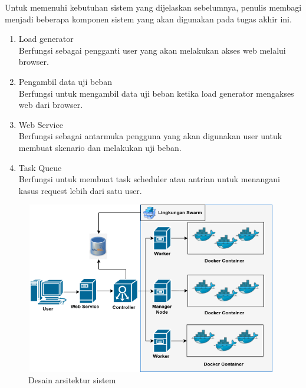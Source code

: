     		Untuk memenuhi kebutuhan sistem yang dijelaskan sebelumnya, penulis membagi menjadi beberapa komponen sistem yang akan digunakan pada tugas akhir ini.
    		
    		\begin{enumerate}
    			\item Load generator \\
    				Berfungsi sebagai pengganti user yang akan melakukan akses web melalui browser.
    			\item Pengambil data uji beban \\
    				Berfungsi untuk mengambil data uji beban ketika load generator mengakses web dari browser.
    			\item Web Service \\
    				Berfungsi sebagai antarmuka pengguna yang akan digunakan user untuk membuat skenario dan melakukan uji beban.
    			\item Task Queue \\
    				Berfungsi untuk membuat task scheduler atau antrian untuk menangani kasus request lebih dari satu user.
    		\end{enumerate}
    	
	    	\begin{figure}[H]
	    		\centering
	    		\includegraphics[width=11cm,height=7.5cm]{Images/C-3/arsitektursistem.png}
	    		\caption{Desain arsitektur sistem}
	    		\label{arsitekturumum}
	    	\end{figure}
    	

